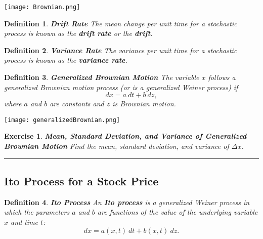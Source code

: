 \documentclass[letterpaper,10pt]{article}
\newtheorem{df}{Definition}[section]
\newtheorem{ex}{Exercise}
\begin{document}
\begin{center}
\texttt{[image: Brownian.png]}
\end{center}

\begin{df}{\bf Drift Rate}
The mean change per unit time for a stochastic process is known as the {\bf drift rate} or the {\bf drift}.
\end{df}

\begin{df}{\bf Variance Rate}
The variance per unit time for a stochastic process is known as the {\bf variance rate}.
\end{df}

\begin{df}{\bf Generalized Brownian Motion}
The variable $x$ follows a generalized Brownian motion process (or is a generalized Weiner process) if $$dx=a\:dt+b\:dz,$$ where $a$ and $b$ are constants and $z$ is Brownian motion.
\end{df}

\begin{center}
\texttt{[image: generalizedBrownian.png]}
\end{center}



\begin{ex}{\bf Mean, Standard Deviation, and Variance of Generalized Brownian Motion}
Find the mean, standard deviation, and variance of $\Delta x$.
\end{ex}



\bigskip

\hrule

\bigskip

\subsection{Ito Process for a Stock Price}

\begin{df}{\bf Ito Process}
An {\bf Ito process} is a generalized Weiner process in which the parameters $a$ and $b$ are functions of the value of the underlying variable $x$ and time $t$:
$$dx = a(x,t)\:dt+b(x,t)\:dz.$$
\end{df}
\end{document}
